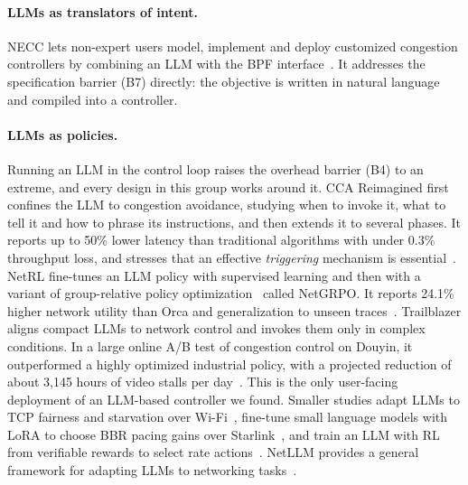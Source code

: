 \paragraph{LLMs as translators of intent.} NECC lets non-expert users model, implement and deploy customized congestion controllers by combining an LLM with the BPF interface~\cite{zhang2025non}. It addresses the specification barrier (B7) directly: the objective is written in natural language and compiled into a controller.

\paragraph{LLMs as policies.} Running an LLM in the control loop raises the overhead barrier (B4) to an extreme, and every design in this group works around it. CCA Reimagined first confines the LLM to congestion avoidance, studying when to invoke it, what to tell it and how to phrase its instructions, and then extends it to several phases. It reports up to 50\% lower latency than traditional algorithms with under 0.3\% throughput loss, and stresses that an effective \emph{triggering} mechanism is essential~\cite{qin2026cca}. NetRL fine-tunes an LLM policy with supervised learning and then with a variant of group-relative policy optimization~\cite{shao2024deepseekmath} called NetGRPO. It reports 24.1\% higher network utility than Orca and generalization to unseen traces~\cite{peng2026netrl}. Trailblazer aligns compact LLMs to network control and invokes them only in complex conditions. In a large online A/B test of congestion control on Douyin, it outperformed a highly optimized industrial policy, with a projected reduction of about 3,145 hours of video stalls per day~\cite{wu2025grounding}. This is the only user-facing deployment of an LLM-based controller we found. Smaller studies adapt LLMs to TCP fairness and starvation over Wi-Fi~\cite{shrestha2024adapting}, fine-tune small language models with LoRA to choose BBR pacing gains over Starlink~\cite{desilva2026small}, and train an LLM with RL from verifiable rewards to select rate actions~\cite{varkey2026poster,varkey2026reasoning}. NetLLM provides a general framework for adapting LLMs to networking tasks~\cite{wu2024netllm}.

